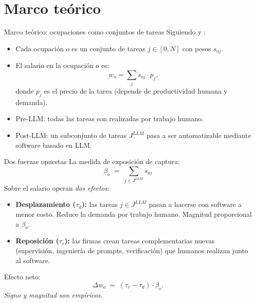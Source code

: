 \documentclass[9pt, aspectratio=169]{beamer}
\begin{document}
\section{Marco teórico}

\begin{frame}{Marco teórico: ocupaciones como conjuntos de tareas}
  Siguiendo \citet{AcemogluAutor2011_tasks} y \citet{AcemogluRestrepo2018_race}:
  \vfill
  \begin{itemize}
    \setlength\itemsep{0.5em}
    \item Cada ocupación $o$ es un conjunto de tareas $j \in [0, N]$ con pesos $s_{oj}$.
    \item El salario en la ocupación $o$ es:
      \[
        w_o = \sum_j s_{oj} \cdot p_j,
      \]
      donde $p_j$ es el precio de la tarea (depende de productividad humana y demanda).
    \item Pre-LLM: todas las tareas son realizadas por trabajo humano.
    \item Post-LLM: un subconjunto de tareas $J^{LLM}$ pasa a ser automatizable mediante software basado en LLM.
  \end{itemize}
\end{frame}

\begin{frame}{Dos fuerzas opuestas}
  La medida de exposición de \citet{Eloundou2023_gpt_exposure} captura:
  \[
    \beta_o \;=\; \sum_{j \in J^{LLM}} s_{oj}
  \]
  \vfill
  Sobre el salario operan \emph{dos efectos}:
  \begin{itemize}
    \setlength\itemsep{0.5em}
    \item \textbf{Desplazamiento ($\tau_d$):} las tareas $j \in J^{LLM}$ pasan a hacerse con software a menor costo. Reduce la demanda por trabajo humano. Magnitud proporcional a $\beta_o$.
    \item \textbf{Reposición ($\tau_r$):} las firmas crean tareas complementarias nuevas (supervisión, ingeniería de prompts, verificación) que humanos realizan junto al software.
  \end{itemize}
  \vfill
  Efecto neto:
  \[
    \Delta w_o \;=\; (\tau_r - \tau_d) \cdot \beta_o.
  \]
  \emph{Signo y magnitud son empíricos.}
\end{frame}
\end{document}

